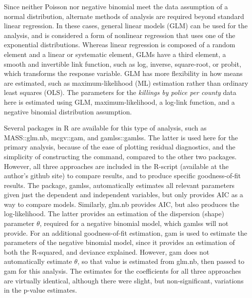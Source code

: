 \documentclass[sigconf]{acmart}
\begin{document}
Since neither Poisson nor negative binomial meet the data assumption of a normal distribution, alternate methods of analysis are required beyond standard linear regression. \cite{fox15,farewell17,beaujean16}  In these cases, general linear models (GLM) can be used for the analysis, and is considered a form of nonlinear regression that uses one of the exponential distributions. \cite{jones11,min02,fox15}  Whereas linear regression is composed of a random element and a linear or systematic element, GLMs have a third element, a smooth and invertible link function, such as log, inverse, square-root, or probit, which transforms the response variable. \cite{fox15}  GLM has more flexibility in how means are estimated, such as maximum-likelihood (ML) estimation rather than ordinary least squares (OLS).  The parameters for the {\em killings by police per county} data here is estimated using GLM, maximum-likelihood, a log-link function, and a negative binomial distribution assumption.  

Several packages in R are available for this type of analysis, such as MASS::glm.nb, mcgv::gam, and gamlss::gamlss.  The latter is used here for the primary analysis, because of the ease of plotting residual diagnostics, and the simplicity of constructing the command, compared to the other two packages.  However, all three approaches are included in the R-script (available at the author's github site) to compare results, and to produce specific goodness-of-fit results. \cite{townsleyR}  The package, gamlss, automatically estimates all relevant parameters given just the dependent and independent variables, but only provides AIC as a way to compare models. \cite{gamlss}  Similarly, glm.nb provides AIC, but also produces the log-likelihood.  The latter provides an estimation of the dispersion (shape) parameter $\theta$, required for a negative binomial model, which gamlss will not provide. For an additional goodness-of-fit estimation, gam is used to estimate the parameters of the negative binomial model, since it provides an estimation of both the R-squared, and deviance explained. \cite{martin16} However, gam does not automatically estimate $\theta$, so that value is estimated from glm.nb, then passed to gam for this analysis.  The estimates for the coefficients for all three approaches are virtually identical, although there were slight, but non-significant, variations in the p-value estimates.
\end{document}
